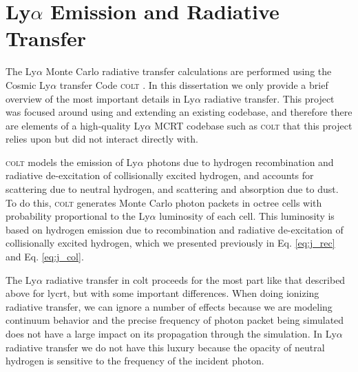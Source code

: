\section{Ly\texorpdfstring{$\alpha$}{a} Emission and Radiative Transfer}
\label{sec:colt}

The Ly$\alpha$ Monte Carlo radiative transfer calculations are performed using the Cosmic Ly$\alpha$ transfer Code \textsc{colt} \citep{Smith2015}.
In this dissertation we only provide a brief overview of the most important details in Ly$\alpha$ radiative transfer.
This project was focused around using and extending an existing codebase, and therefore there are elements of a high-quality Ly$\alpha$ MCRT codebase such as \textsc{colt} that this project relies upon but did not interact directly with.

\textsc{colt} models the  emission of Ly$\alpha$ photons due to hydrogen recombination and radiative de-excitation of collisionally excited hydrogen, and accounts for scattering due to neutral hydrogen, and scattering and absorption due to dust.
To do this, \textsc{colt} generates Monte Carlo photon packets in octree cells with probability proportional to the Ly$\alpha$ luminosity of each cell.
This luminosity is based on hydrogen emission due to recombination and radiative de-excitation of collisionally excited hydrogen, which we presented previously in Eq. \ref{eq:j_rec} and Eq. \ref{eq:j_col}.

The Ly$\alpha$ radiative transfer in {\sc colt} proceeds for the most part like that described above for {\sc lycrt}, but with some important differences.
When doing ionizing radiative transfer, we can ignore a number of effects because we are modeling continuum behavior and the precise frequency of photon packet being simulated does not have a large impact on its propagation through the simulation.
In Ly$\alpha$ radiative transfer we do not have this luxury because the opacity of neutral hydrogen is sensitive to the frequency of the incident photon.

